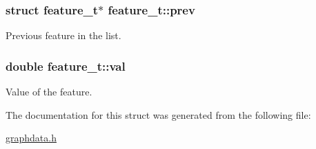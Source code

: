 \subsubsection[{\texorpdfstring{prev}{prev}}]{\setlength{\rightskip}{0pt plus 5cm}struct {\bf feature\+\_\+t}$\ast$ feature\+\_\+t\+::prev}\hypertarget{structfeature__t_a58ef49f2333101b378c9301bd748c9ff}{}\label{structfeature__t_a58ef49f2333101b378c9301bd748c9ff}
Previous feature in the list. 
\subsubsection[{\texorpdfstring{val}{val}}]{\setlength{\rightskip}{0pt plus 5cm}double feature\+\_\+t\+::val}\hypertarget{structfeature__t_ad4881468d7929ea65cb2a3b96e8556da}{}\label{structfeature__t_ad4881468d7929ea65cb2a3b96e8556da}
Value of the feature. 

The documentation for this struct was generated from the following file\+:\begin{DoxyCompactItemize}
\item 
\hyperlink{graphdata_8h}{graphdata.\+h}\end{DoxyCompactItemize}
